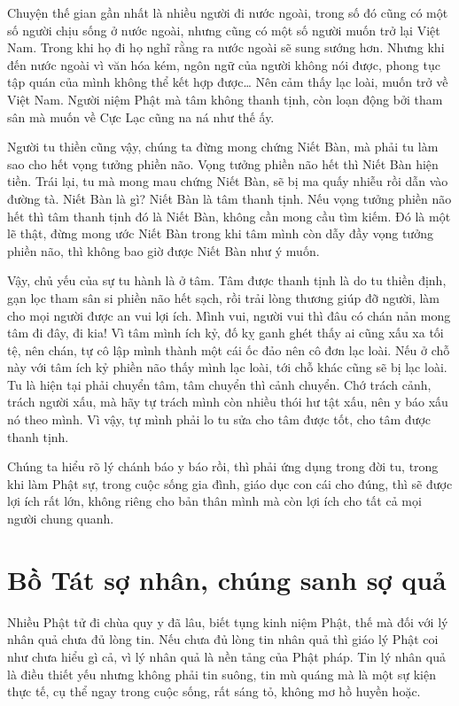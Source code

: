 \documentclass[
  12pt,
  oneside]{book}
\begin{document}
Chuyện thế gian gần nhất là nhiều người đi nước ngoài, trong số đó cũng có một số người chịu sống ở nước ngoài, nhưng cũng có một số người muốn trở lại Việt Nam. Trong khi họ đi họ nghĩ rằng ra nước ngoài sẽ sung sướng hơn. Nhưng khi đến nước ngoài vì văn hóa kém, ngôn ngữ của người không nói được, phong tục tập quán của mình không thể kết hợp được\ldots{} Nên cảm thấy lạc loài, muốn trở về Việt Nam. Người niệm Phật mà tâm không thanh tịnh, còn loạn động bởi tham sân mà muốn về Cực Lạc cũng na ná như thế ấy.

Người tu thiền cũng vậy, chúng ta đừng mong chứng Niết Bàn, mà phải tu làm sao cho hết vọng tưởng phiền não. Vọng tưởng phiền não hết thì Niết Bàn hiện tiền. Trái lại, tu mà mong mau chứng Niết Bàn, sẽ bị ma quấy nhiễu rồi dẫn vào đường tà. Niết Bàn là gì? Niết Bàn là tâm thanh tịnh. Nếu vọng tưởng phiền não hết thì tâm thanh tịnh đó là Niết Bàn, không cần mong cầu tìm kiếm. Đó là một lẽ thật, đừng mong ước Niết Bàn trong khi tâm mình còn dẫy đầy vọng tưởng phiền não, thì không bao giờ được Niết Bàn như ý muốn.

Vậy, chủ yếu của sự tu hành là ở tâm. Tâm được thanh tịnh là do tu thiền định, gạn lọc tham sân si phiền não hết sạch, rồi trải lòng thương giúp đỡ người, làm cho mọi người được an vui lợi ích. Mình vui, người vui thì đâu có chán nản mong tâm đi đây, đi kia! Vì tâm mình ích kỷ, đố kỵ ganh ghét thấy ai cũng xấu xa tối tệ, nên chán, tự cô lập mình thành một cái ốc đảo nên cô đơn lạc loài. Nếu ở chỗ này với tâm ích kỷ phiền não thấy mình lạc loài, tới chỗ khác cũng sẽ bị lạc loài. Tu là hiện tại phải chuyển tâm, tâm chuyển thì cảnh chuyển. Chớ trách cảnh, trách người xấu, mà hãy tự trách mình còn nhiều thói hư tật xấu, nên y báo xấu nó theo mình. Vì vậy, tự mình phải lo tu sửa cho tâm được tốt, cho tâm được thanh tịnh.

Chúng ta hiểu rõ lý chánh báo y báo rồi, thì phải ứng dụng trong đời tu, trong khi làm Phật sự, trong cuộc sống gia đình, giáo dục con cái cho đúng, thì sẽ được lợi ích rất lớn, không riêng cho bản thân mình mà còn lợi ích cho tất cả mọi người chung quanh.

\hypertarget{bo-tat-so-nhan-chung-sanh-so-qua}{%
\chapter*{Bồ Tát sợ nhân, chúng sanh sợ quả}\label{bo-tat-so-nhan-chung-sanh-so-qua}}

Nhiều Phật tử đi chùa quy y đã lâu, biết tụng kinh niệm Phật, thế mà đối với lý nhân quả chưa đủ lòng tin. Nếu chưa đủ lòng tin nhân quả thì giáo lý Phật coi như chưa hiểu gì cả, vì lý nhân quả là nền tảng của Phật pháp. Tin lý nhân quả là điều thiết yếu nhưng không phải tin suông, tin mù quáng mà là một sự kiện thực tế, cụ thể ngay trong cuộc sống, rất sáng tỏ, không mơ hồ huyền hoặc.
\end{document}
